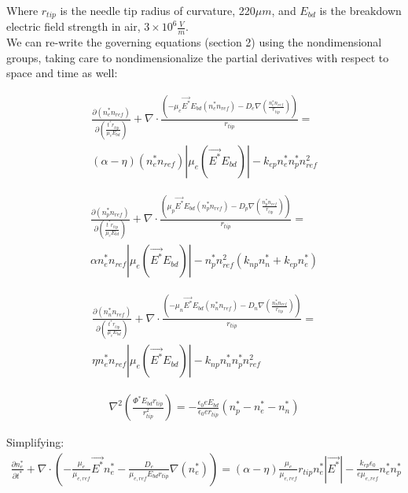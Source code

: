 \documentclass[12pt, a4paper]{report}
\begin{document}
\noindent
Where $r_{tip}$ is the needle tip radius of curvature, 220$\mu m$, and $E_{bd}$ is the breakdown electric field strength in air, $3\times10^6 \frac{V}{m}$.\\

\noindent
We can re-write the governing equations (section 2) using the nondimensional groups, taking care to nondimensionalize the partial derivatives with respect to space and time as well:

\begin{align*}
        \frac{\partial (n_e^* n_{ref})}{\partial \left(\frac{t^*r_{tip}}{\mu_e E_{bd}}  \right)} + \nabla \cdot\frac{\left( -\mu_e\vec{E^*}E_{bd}(n_e^*n_{ref}) - D_e\nabla \left(\frac{n_e^* n_{ref}}{r_{tip}}  \right) \right)}{r_{tip}} = \\ (\alpha - \eta) (n_e^*n_{ref})|\mu_e(\vec{E^*}E_{bd})| - k_{ep}n_e^*n_p^*n_{ref}^2
\end{align*}

\begin{align*}
    \frac{\partial (n_p^* n_{ref})}{\partial \left(\frac{t^*r_{tip}}{\mu_e E_{bd}}  \right)} + \nabla \cdot\frac{\left(\mu_p\vec{E^*}E_{bd}(n_p^*n_{ref}) - D_p\nabla \left(\frac{n_p^* n_{ref}}{r_{tip}}  \right) \right)}{r_{tip}} = \\ \alpha n_e^*n_{ref} |\mu_e(\vec{E^*}E_{bd})| - n_p^*n_{ref}^2\left(k_{np}n_n^* + k_{ep}n_e^*\right)
\end{align*}

\begin{align*}
    \frac{\partial (n_n^* n_{ref})}{\partial \left(\frac{t^*r_{tip}}{\mu_e E_{bd}}  \right)} + \nabla \cdot\frac{\left(-\mu_n\vec{E^*}E_{bd}(n_n^*n_{ref}) - D_n\nabla \left(\frac{n_n^* n_{ref}}{r_{tip}}  \right) \right)}{r_{tip}} = \\ \eta n_e^*n_{ref}|\mu_e(\vec{E^*}E_{bd})| - k_{np}n_n^*n_p^*n_{ref}^2
\end{align*}

\begin{align*}
    \nabla^2 \left(\frac{\Phi^*E_{bd}r_{tip}}{r_{tip}^2}\right) = -\frac{\epsilon_0 e E_{bd}}{\epsilon_0 e r_{tip}} (n_p^*-n_e^*-n_n^*)
\end{align*}

\noindent
Simplifying:
\begin{align*}
        \frac{\partial n_e^* }{\partial t^*} + \nabla \cdot \left(- \frac{\mu_e}{\mu_{e,ref}} \vec{E^*}n_e^* - \frac{{D_e}}{\mu_{e,ref} E_{bd}r_{tip}}\nabla (n_e^*)\right) = (\alpha - \eta)\frac{\mu_e}{\mu_{e,ref}}r_{tip} n_e^*|\vec{E^*}| - \frac{k_{ep} \epsilon_0}{e \mu_{e,ref}} n_e^*n_p^*
\end{align*}
\end{document}
